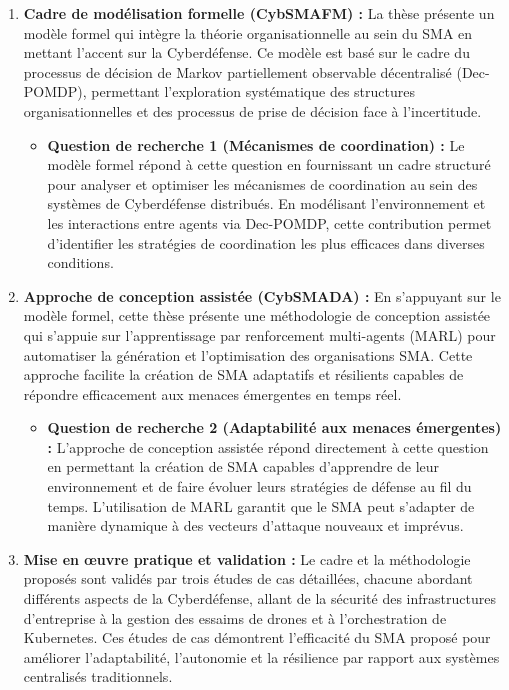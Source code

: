 \begin{enumerate}
    \item \textbf{Cadre de modélisation formelle (CybSMAFM) :} La thèse présente un modèle formel qui intègre la théorie organisationnelle au sein du SMA en mettant l'accent sur la Cyberdéfense. Ce modèle est basé sur le cadre du processus de décision de Markov partiellement observable décentralisé (Dec-POMDP), permettant l'exploration systématique des structures organisationnelles et des processus de prise de décision face à l'incertitude.

          \begin{itemize}
              \item \textbf{Question de recherche 1 (Mécanismes de coordination) :} Le modèle formel répond à cette question en fournissant un cadre structuré pour analyser et optimiser les mécanismes de coordination au sein des systèmes de Cyberdéfense distribués. En modélisant l'environnement et les interactions entre agents via Dec-POMDP, cette contribution permet d'identifier les stratégies de coordination les plus efficaces dans diverses conditions.
          \end{itemize}

    \item \textbf{Approche de conception assistée (CybSMADA) :} En s'appuyant sur le modèle formel, cette thèse présente une méthodologie de conception assistée qui s'appuie sur l'apprentissage par renforcement multi-agents (MARL) pour automatiser la génération et l'optimisation des organisations SMA. Cette approche facilite la création de SMA adaptatifs et résilients capables de répondre efficacement aux menaces émergentes en temps réel.

          \begin{itemize}
              \item \textbf{Question de recherche 2 (Adaptabilité aux menaces émergentes) :} L'approche de conception assistée répond directement à cette question en permettant la création de SMA capables d'apprendre de leur environnement et de faire évoluer leurs stratégies de défense au fil du temps. L'utilisation de MARL garantit que le SMA peut s'adapter de manière dynamique à des vecteurs d'attaque nouveaux et imprévus.
          \end{itemize}

    \item \textbf{Mise en œuvre pratique et validation :} Le cadre et la méthodologie proposés sont validés par trois études de cas détaillées, chacune abordant différents aspects de la Cyberdéfense, allant de la sécurité des infrastructures d'entreprise à la gestion des essaims de drones et à l'orchestration de Kubernetes. Ces études de cas démontrent l'efficacité du SMA proposé pour améliorer l'adaptabilité, l'autonomie et la résilience par rapport aux systèmes centralisés traditionnels.


\end{enumerate}
